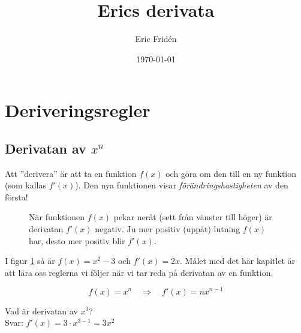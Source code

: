 \documentclass[a4paper, 12pt]{article}
\title{Erics derivata}
\author{Eric Fridén}
\date{\today}
\begin{document}
\newcommand{\ans}[1][5]{= \textcolor{lightgray}{\rule[-.5 em]{#1 em}{.05 em}}}
\newcommand{\imp}{\hspace{1em} \Longrightarrow \hspace{1em}}

\doublespacing
\maketitle

\section{Deriveringsregler}

\subsection{Derivatan av $x^n$}

Att ''derivera'' är att ta en funktion $f(x)$ och göra om den till en ny funktion (som kallas $f'(x)$). Den nya funktionen visar \emph{förändringshastigheten} av den första!

\begin{figure}[h]
    \centering
    \caption{När funktionen $f(x)$ pekar neråt (sett från vänster till höger) är derivatan $f'(x)$ negativ. Ju mer positiv (uppåt) lutning $f(x)$ har, desto mer positiv blir $f'(x)$.}
    \label{fig:1}
\end{figure}

I figur \ref{fig:1} så är $f(x) = x^2 - 3$ och $f'(x) = 2x$. Målet med det här kapitlet är att lära oss reglerna vi följer när vi tar reda på derivatan av en funktion.

\begin{regel}
    \[f(x) = x^n \imp f'(x) = nx^{n-1}\]
\end{regel}

\begin{exempel}
    Vad är derivatan av $x^3$?\\
    Svar: $f'(x) = 3\cdot x^{3-1} = 3x^2$
\end{exempel}
\end{document}
